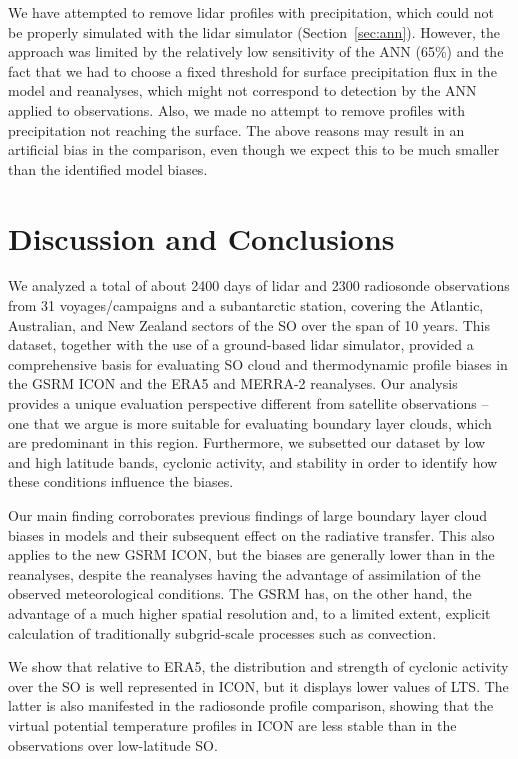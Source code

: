 \documentclass[draft]{agujournal2019}
\begin{document}
We have attempted to remove lidar profiles with precipitation, which could not be properly simulated with the lidar simulator (Section~\ref{sec:ann}). However, the approach was limited by the relatively low sensitivity of the ANN (65\%) and the fact that we had to choose a fixed threshold for surface precipitation flux in the model and reanalyses, which might not correspond to detection by the ANN applied to observations. Also, we made no attempt to remove profiles with precipitation not reaching the surface. The above reasons may result in an artificial bias in the comparison, even though we expect this to be much smaller than the identified model biases.

\section{Discussion and Conclusions}

We analyzed a total of about 2400 days of lidar and 2300 radiosonde observations from 31 voyages/campaigns and a subantarctic station, covering the Atlantic, Australian, and New Zealand sectors of the SO over the span of 10 years. This dataset, together with the use of a ground-based lidar simulator, provided a comprehensive basis for evaluating SO cloud and thermodynamic profile biases in the GSRM ICON and the ERA5 and MERRA-2 reanalyses. Our analysis provides a unique evaluation perspective different from satellite observations -- one that we argue is more suitable for evaluating boundary layer clouds, which are predominant in this region. Furthermore, we subsetted our dataset by low and high latitude bands, cyclonic activity, and stability in order to identify how these conditions influence the biases.

Our main finding corroborates previous findings of large boundary layer cloud biases in models and their subsequent effect on the radiative transfer. This also applies to the new GSRM ICON, but the biases are generally lower than in the reanalyses, despite the reanalyses having the advantage of assimilation of the observed meteorological conditions. The GSRM has, on the other hand, the advantage of a much higher spatial resolution and, to a limited extent, explicit calculation of traditionally subgrid-scale processes such as convection.

We show that relative to ERA5, the distribution and strength of cyclonic activity over the SO is well represented in ICON, but it displays lower values of LTS. The latter is also manifested in the radiosonde profile comparison, showing that the virtual potential temperature profiles in ICON are less stable than in the observations over low-latitude SO.
\end{document}
